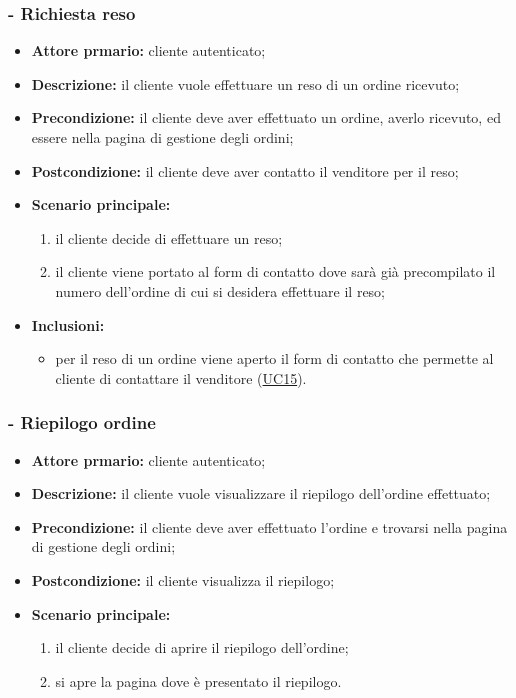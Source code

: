 \subsubsection{ - Richiesta reso}
\begin{itemize}
    \item \textbf{Attore prmario:} cliente autenticato;
    \item \textbf{Descrizione:} il cliente vuole effettuare un reso di un ordine ricevuto;
    \item \textbf{Precondizione:} il cliente deve aver effettuato un ordine, averlo ricevuto, ed essere nella pagina di gestione degli ordini;
    \item \textbf{Postcondizione:} il cliente deve aver contatto il venditore per il reso;
    \item \textbf{Scenario principale:}
          \begin{enumerate}
              \item il cliente decide di effettuare un reso;
              \item il cliente viene portato al form di contatto dove sarà già precompilato il numero dell'ordine di cui si desidera effettuare il reso;
          \end{enumerate}
    \item \textbf{Inclusioni:}
          \begin{itemize}
              \item per il reso di un ordine viene aperto il form di contatto che permette al cliente di contattare il venditore (\hyperref[UC15]{UC15}).
          \end{itemize}
\end{itemize}

\stepsubUserCase
\subsubsection{ - Riepilogo ordine}
\begin{itemize}
    \item \textbf{Attore prmario:} cliente autenticato;
    \item \textbf{Descrizione:} il cliente vuole visualizzare il riepilogo dell'ordine effettuato;
    \item \textbf{Precondizione:} il cliente deve aver effettuato l'ordine e trovarsi nella pagina di gestione degli ordini;
    \item \textbf{Postcondizione:} il cliente visualizza il riepilogo;
    \item \textbf{Scenario principale:}
          \begin{enumerate}
              \item il cliente decide di aprire il riepilogo dell'ordine;
              \item si apre la pagina dove è presentato il riepilogo.
          \end{enumerate}
\end{itemize}

